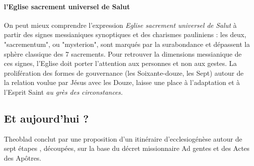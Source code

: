 \paragraph{l'Eglise sacrement universel de Salut} On peut mieux comprendre l'expression \textit{Eglise sacrement universel de Salut} à partir des signes messianiques synoptiques et des charismes pauliniens : les deux, "sacrementum", ou "mysterion", sont marqués par la surabondance et dépassent la sphère classique des 7 sacrements. Pour retrouver la dimensions messianique de ces signes, l'Eglise doit porter l'attention aux personnes et non aux gestes. La prolifération des formes de gouvernance (les Soixante-douze, les Sept) autour de la relation voulue par Jésus avec les Douze, laisse une place à l'adaptation et à l'Esprit Saint \textit{au grès des circonstances.}



 


\subsection{ Et aujourd'hui ?}
Theoblad conclut par une proposition d'un itinéraire d'ecclesiogénèse autour de   sept étapes , découpées, sur la base du décret missionnaire Ad gentes et des Actes des Apôtres.

